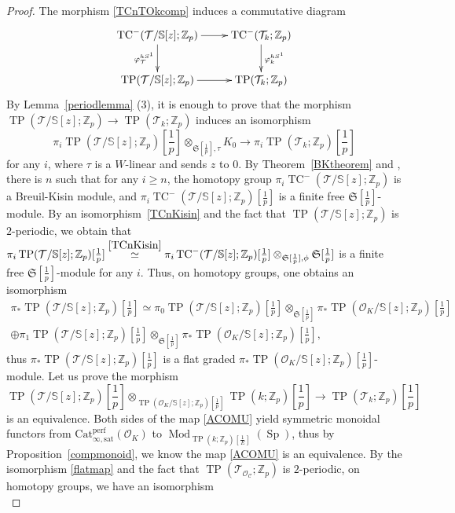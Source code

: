 \documentclass[11pt]{amsart}
\newcommand{\Z}{\mathbb{Z}}
\newcommand{\sO}{\mathcal{O}}
\newcommand{\sT}{\mathcal{T}}
\newcommand{\bS}{\mathbb{S}}
\newcommand{\Mod}{\operatorname{Mod}}
\newcommand{\TP}{\operatorname{TP}}
\newcommand{\TCn}{\operatorname{TC}^{-}}
\newcommand{\Cu}{\mathcal{C}}
\newcommand{\mS}{\mathfrak{S}}
\newcommand{\Catsat}{\operatorname{Cat_{\infty,sat}^{perf}}}
\newcommand{\Sp}{\operatorname{Sp}}
\theoremstyle{definition}
\theoremstyle{remark}
\numberwithin{equation}{section}
\begin{document}
\begin{proof}
  The morphism \eqref{TCnTOkcomp} induces a commutative diagram
  \[
  \xymatrix{
  \TCn(\sT/\bS[z];\Z_p) \ar[d]_{\varphi^{hS^1}_{\sT}} \ar[r]& \TCn(\sT_k;\Z_p) \ar[d]^{\varphi^{hS^1}_k} \\
    \TP(\sT/\bS[z];\Z_p)   \ar[r]&\TP(\sT_k;\Z_p) 
  }
  \]
  By Lemma~\ref{periodlemma} (3), it is enough to prove that the morphism $\TP(\sT/\bS[z];\Z_p) \to\TP(\sT_k;\Z_p) $ induces an isomorphism
  \[
  \pi_i \TP(\sT/\bS[z];\Z_p)[\frac{1}{p}]\otimes_{\mS [\frac{1}{p}],\tau} K_0 \to \pi_i \TP(\sT_k;\Z_p)[\frac{1}{p}]
  \]
  for any $i$, where $\tau$ is a $W$-linear and sends $z$ to $0$. By Theorem~\ref{BKtheorem} and \cite[Proposition 4.3]{BMS1}, there is $n$ such that for any $i\geq n$, the homotopy group $\pi_i\TCn(\sT/\bS[z];\Z_p)$ is a Breuil-Kisin module, and $\pi_i\TCn(\sT/\bS[z];\Z_p)[\frac{1}{p}]$ is a finite free $\mS[\frac{1}{p}]$-module. By an isomorphism~\ref{TCnKisin} and the fact that $\TP(\sT/\bS[z];\Z_p)$ is $2$-periodic, we obtain that $\pi_i\TP(\sT/\bS[z];\Z_p)[\frac{1}{p}]\overset{\eqref{TCnKisin}}{\simeq} \pi_i\TCn(\sT/\bS[z];\Z_p)[\frac{1}{p}]\otimes_{\mS[\frac{1}{p}],\phi}\mS[\frac{1}{p}]$ is a finite free $\mS[\frac{1}{p}]$-module for any $i$. Thus, on homotopy groups, one obtains an isomorphism 
  \begin{eqnarray}\label{flatmap}
 \pi_*\TP(\sT/\bS[z];\Z_p)[\frac{1}{p}]\simeq \pi_0\TP(\sT/\bS[z];\Z_p)[\frac{1}{p}]\otimes_{\mS[\frac{1}{p}]} \pi_*\TP(\sO_K/\bS[z];\Z_p)[\frac{1}{p}] \\
 \oplus \pi_1\TP(\sT/\bS[z];\Z_p)[\frac{1}{p}]\otimes_{\mS[\frac{1}{p}]}\pi_*\TP(\sO_K/\bS[z];\Z_p)[\frac{1}{p}],\nonumber
  \end{eqnarray}
  thus $\pi_*\TP(\sT/\bS[z];\Z_p)[\frac{1}{p}]$ is a flat graded $\pi_*\TP(\sO_K/\bS[z];\Z_p)[\frac{1}{p}]$-module. Let us prove the morphism
  \begin{equation}\label{ACOMU}
  \TP(\sT/\bS[z];\Z_p)[\frac{1}{p}] \otimes_{\TP(\sO_K/\bS[z];\Z_p)[\frac{1}{p}]} \TP(k;\Z_p)[\frac{1}{p}] \to \TP(\sT_k;\Z_p)[\frac{1}{p}]
  \end{equation}
  is an equivalence. Both sides of the map \eqref{ACOMU} yield symmetric monoidal functors from $\Catsat(\sO_K)$ to $\Mod_{\TP(k;\Z_p)[\frac{1}{E}]}(\Sp)$, thus by Proposition~\ref{compmonoid}, we know the map \eqref{ACOMU} is an equivalence. By the isomorphism \eqref{flatmap} and the fact that $\TP(\sT_{\sO_\Cu};\Z_p)$ is $2$-periodic, on homotopy groups, we have an isomorphism
\begin{equation}\label{TPTPcomp}

\end{equation}
\end{proof}
\end{document}
